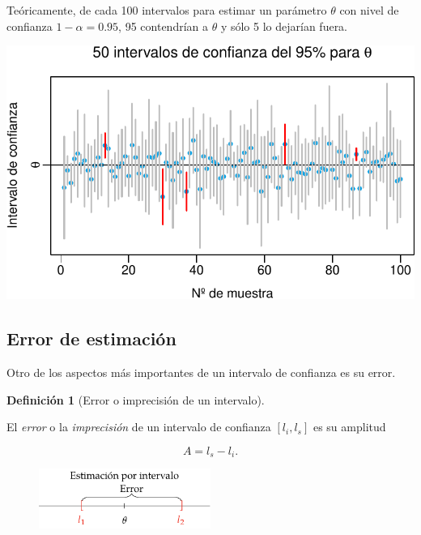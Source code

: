 \documentclass[
  a4paper,
]{scrreport}
\theoremstyle{plain}
\theoremstyle{definition}
\theoremstyle{definition}
\newtheorem{definition}{Definición}[chapter]
\theoremstyle{remark}
\begin{document}
Teóricamente, de cada 100 intervalos para estimar un parámetro
\(\theta\) con nivel de confianza \(1-\alpha=0.95\), 95 contendrían a
\(\theta\) y sólo 5 lo dejarían fuera.

\includegraphics{07-estimacion_files/figure-pdf/unnamed-chunk-1-1.pdf}

\hypertarget{error-de-estimaciuxf3n}{%
\subsection{Error de estimación}\label{error-de-estimaciuxf3n}}

Otro de los aspectos más importantes de un intervalo de confianza es su
error.

\begin{definition}[Error o imprecisión de un
intervalo]\protect\hypertarget{def-error-intervalo-confianza}{}\label{def-error-intervalo-confianza}

El \emph{error} o la \emph{imprecisión} de un intervalo de confianza
\([l_i,l_s]\) es su amplitud

\[
A=l_s-l_i.
\]

\end{definition}

\begin{figure}

{\centering \includegraphics[width=0.5\textwidth,height=\textheight]{img/estimacion/error-estimacion-intervalo.pdf}

}

\end{figure}
\end{document}
